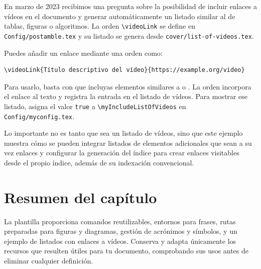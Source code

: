 En marzo de 2023 recibimos una pregunta sobre la posibilidad de incluir enlaces a vídeos en el documento y generar automáticamente un listado similar al de tablas, figuras o algoritmos. La orden \texttt{\textbackslash{}videoLink} se define en \texttt{Config/postamble.tex} y su listado se genera desde \texttt{cover/list-of-videos.tex}.

Puedes añadir un enlace mediante una orden como:

\begin{verbatim}
\videoLink{Título descriptivo del vídeo}{https://example.org/video}
\end{verbatim}

Para usarlo, basta con que incluyas elementos similares a  o . La orden incorpora el enlace al texto y registra la entrada en el listado de vídeos. Para mostrar ese listado, asigna el valor \texttt{true} a \texttt{\textbackslash{}myIncludeListOfVideos} en \texttt{Config/myconfig.tex}.

Lo importante no es tanto que sea un listado de vídeos, sino que este ejemplo muestra cómo se pueden integrar listados de elementos adicionales que sean a su vez enlaces y configurar la generación del índice para crear enlaces visitables desde el propio índice, además de su indexación convencional.

\section{Resumen del capítulo}
\label{sec:resumen-elementos-utilidad}

La plantilla proporciona comandos reutilizables, entornos para frases, rutas preparadas para figuras y diagramas, gestión de acrónimos y símbolos, y un ejemplo de listados con enlaces a vídeos. Conserva y adapta únicamente los recursos que resulten útiles para tu documento, comprobando sus usos antes de eliminar cualquier definición.








